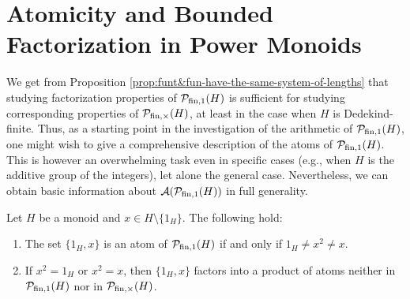 \section{Atomicity and Bounded Factorization in Power Monoids} \label{sec:atomicity}

We get from Proposition \ref{prop:funt&fun-have-the-same-system-of-lengths} that studying factorization properties of $\mathcal{P}_{\textrm{fin}, 1}(H)$ is sufficient for studying corresponding properties of $\mathcal{P}_{\textrm{fin}, \times}(H)$, at least in the case when $H$ is Dedekind-finite.
Thus, as a starting point in the investigation of the arithmetic of $\mathcal{P}_{\textrm{fin}, 1}(H)$, one might wish to give a comprehensive description of
the atoms of $\mathcal{P}_{\textrm{fin}, 1}(H)$.
This is however an overwhelming task even in specific cases (e.g., when $H$ is the additive group of the integers), let alone the general case. Nevertheless, we can obtain basic information about $\mathcal{A}(\mathcal{P}_{\textrm{fin}, 1}(H))$ in full generality.
%
%
\begin{lemma}\label{lem:2-elt-atoms}
Let $H$ be a monoid and $x \in H \setminus \{1_H\}$.
The following hold:
\begin{enumerate}[label={\rm (\roman{*})}]
%
\item\label{it:lem:2-elt-atoms(i)} The set $\{1_H, x\}$ is an atom of $\mathcal{P}_{\textrm{fin}, 1}(H)$ if and only if $1_H \ne x^2 \ne x$.
\item\label{it:lem:2-elt-atoms(ii)} If $x^2=1_H$ or $x^2=x$, then $\{1_H,x\}$ factors into a product of atoms neither in $\mathcal{P}_{\textrm{fin},1}(H)$ nor in $\mathcal{P}_{\textrm{fin}, \times}(H)$.
\end{enumerate}
\end{lemma}
%
